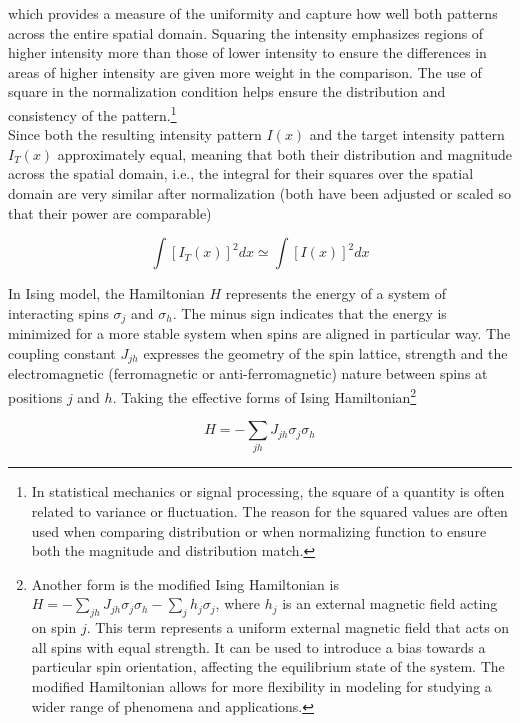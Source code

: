 which provides a measure of the uniformity and capture how well both patterns across the entire spatial domain. Squaring the intensity emphasizes regions of higher intensity more than those of lower intensity to ensure the differences in areas of higher intensity are given more weight in the comparison. The use of square in the normalization condition helps ensure the distribution and consistency of the pattern.\footnote{In statistical mechanics or signal processing, the square of a quantity is often related to variance or fluctuation. The reason for the squared values are often used when comparing distribution or when normalizing function to ensure both the magnitude and distribution match.}\\

Since both the resulting intensity pattern $I(x)$ and the target intensity pattern $I_T(x)$ approximately equal, meaning that both their distribution and magnitude across the spatial domain, i.e., the integral for their squares over the spatial domain are very similar after normalization (both have been adjusted or scaled so that their power are comparable)

\begin{equation}
\int [I_T(x)]^2 dx \simeq  \int [I(x)]^2 dx
\end{equation}

In Ising model, the Hamiltonian $H$ represents the energy of a system of interacting spins $\sigma_j$ and $\sigma_h$. The minus sign indicates that the energy is minimized for a more stable system when spins are aligned in particular way. The coupling constant $J_{jh}$ expresses the geometry of the spin lattice, strength and the electromagnetic (ferromagnetic or anti-ferromagnetic) nature between spins at positions $j$ and $h$. Taking the effective forms of Ising Hamiltonian\footnote{Another form is the modified Ising Hamiltonian is $H = - \sum_{jh} J_{jh} \sigma_j \sigma_h - \sum_j h_j \sigma_j$, where $h_j$ is an external magnetic field acting on spin $j$. This term represents a uniform external magnetic field that acts on all spins with equal strength. It can be used to introduce a bias towards a particular spin orientation, affecting the equilibrium state of the system. The modified Hamiltonian allows for more flexibility in modeling for studying a wider range of phenomena and applications.}

\begin{equation}
H = - \sum_{jh} J_{jh} \sigma_j \sigma_h
\end{equation}

